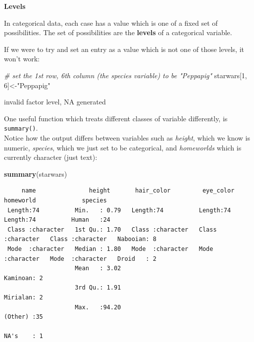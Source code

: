 \documentclass[]{book}
\newenvironment{Shaded}{\begin{snugshade}}{\end{snugshade}}
\newcommand{\CommentTok}[1]{\textcolor[rgb]{0.56,0.35,0.01}{\textit{#1}}}
\newcommand{\DecValTok}[1]{\textcolor[rgb]{0.00,0.00,0.81}{#1}}
\newcommand{\KeywordTok}[1]{\textcolor[rgb]{0.13,0.29,0.53}{\textbf{#1}}}
\newcommand{\NormalTok}[1]{#1}
\newcommand{\StringTok}[1]{\textcolor[rgb]{0.31,0.60,0.02}{#1}}
\begin{document}
\textbf{Levels}

In categorical data, each case has a value which is one of a fixed set of possibilities. The set of possibilities are the \textbf{levels} of a categorical variable.

If we were to try and set an entry as a value which is not one of those levels, it won't work:

\begin{Shaded}
\begin{Highlighting}[]
\CommentTok{# set the 1st row, 6th column (the species variable) to be "Peppapig"}
\NormalTok{starwars[}\DecValTok{1}\NormalTok{, }\DecValTok{6}\NormalTok{]<-}\StringTok{"Peppapig"}
\end{Highlighting}
\end{Shaded}

invalid factor level, NA generated

One useful function which treats different classes of variable differently, is \texttt{summary()}.\\
Notice how the output differs between variables such as \emph{height}, which we know is numeric, \emph{species}, which we just set to be categorical, and \emph{homeworlds} which is currently character (just text):

\begin{Shaded}
\begin{Highlighting}[]
\KeywordTok{summary}\NormalTok{(starwars)}
\end{Highlighting}
\end{Shaded}

\begin{verbatim}
     name               height       hair_color         eye_color          homeworld             species  
 Length:74          Min.   : 0.79   Length:74          Length:74          Length:74          Human   :24  
 Class :character   1st Qu.: 1.70   Class :character   Class :character   Class :character   Nabooian: 8  
 Mode  :character   Median : 1.80   Mode  :character   Mode  :character   Mode  :character   Droid   : 2  
                    Mean   : 3.02                                                            Kaminoan: 2  
                    3rd Qu.: 1.91                                                            Mirialan: 2  
                    Max.   :94.20                                                            (Other) :35  
                                                                                             NA's    : 1  
\end{verbatim}
\end{document}
